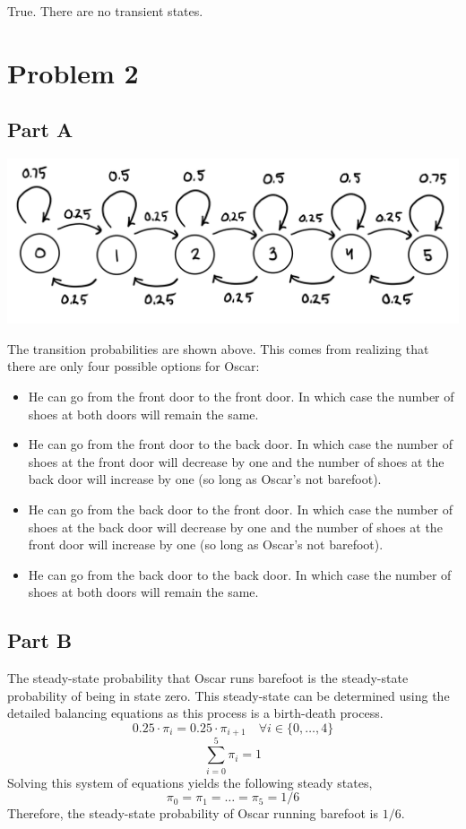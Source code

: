 \documentclass{article}
\begin{document}
True. There are no transient states.

\section*{Problem 2}

\subsection*{Part A}

\begin{center}
    \includegraphics[scale=0.25]{Images/P2A.PNG}
\end{center}

The transition probabilities are shown above. This comes from realizing that
there are only four possible options for Oscar:
\begin{itemize}
  \item He can go from the front door to the front door. In which case the
  number of shoes at both doors will remain the same.
  \item He can go from the front door to the back door. In which case the
  number of shoes at the front door will decrease by one and the number of
  shoes at the back door will increase by one (so long as Oscar's not
  barefoot).
  \item He can go from the back door to the front door. In which case the
  number of shoes at the back door will decrease by one and the number of 
  shoes at the front door will increase by one (so long as Oscar's not 
  barefoot).
  \item He can go from the back door to the back door. In which case the
  number of shoes at both doors will remain the same.
\end{itemize}

\subsection*{Part B}

The steady-state probability that Oscar runs barefoot is the steady-state
probability of being in state zero. This steady-state can be determined using
the detailed balancing equations as this process is a birth-death process.
$$ 0.25 \cdot \pi_i = 0.25 \cdot \pi_{i + 1}\quad \forall i \in \{0, \ldots,
4\} $$
$$ \sum_{i = 0}^{5} \pi_i = 1 $$
Solving this system of equations yields the following steady states,
$$ \pi_0 = \pi_1 = \ldots = \pi_5 = 1/6 $$
Therefore, the steady-state probability of Oscar running barefoot is $1/6$.
\end{document}
